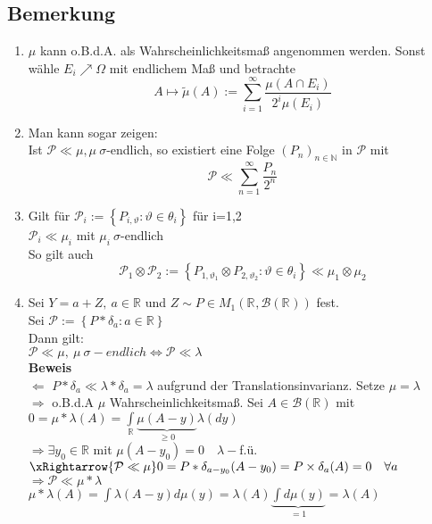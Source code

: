 \documentclass[german,10pt,oneside, fleqn, a4paper]{article}
\newcommand {\R}	{\mathbb{R}}
\newcommand {\N}	{\mathbb{N}}
\newcommand{\Ra}	{\Rightarrow}
\newcommand{\La}	{\Leftarrow}
\newcommand{\LRa}{\Leftrightarrow}
\newcommand{\sm}[2][\infty]{\sum\limits_{#2}^{#1}}
\newcommand{\brc}[1]{\left(#1\right)}
\newcommand{\brac}[1]{\left\lbrace #1\right\rbrace}
\newcommand{\folge}[3][\N]{\left(#2_#3\right)_{#3\in #1}}
\newcommand{\mc}[1]{\mathcal{#1}}
\newcommand{\beweis}{\textbf{Beweis}\\}
\newcommand{\1}[1]{1_{#1}}
\newcommand{\2}[1]{\1{\brac{#1}}}
\newcommand{\rbor}[1][d]{\brc{\R^{#1},\mc{B}\brc{\R^{#1}}}}
\newcommand{\intr}{\int\limits_\R}
\newcommand{\p}{\mc{P}}
\begin{document}
\subsection{Bemerkung}
\label{9.7}
\begin{enumerate}[label=(\roman*)]
\item $\mu$ kann o.B.d.A. als Wahrscheinlichkeitsmaß angenommen werden. Sonst wähle $E_i\nearrow\Omega$ mit endlichem Maß und betrachte\[
A\mapsto\tilde{\mu}(A):=\sm{i=1}\dfrac{\mu(A\cap E_i)}{2^i\mu(E_i)}\]
\item Man kann sogar zeigen: \\
Ist $\p\ll\mu, \mu\ \sigma$-endlich, so existiert eine Folge $\folge{P}{n}$ in $\p$ mit \[
\p\ll\sm{n=1}\dfrac{P_n}{2^n}\]
\item Gilt für $\p_i:=\brac{P_{i,\vartheta}:\vartheta\in\theta_i}$ für i=1,2 \\
$\p_i\ll\mu_i$ mit $\mu_i\ \sigma$-endlich\\
So gilt auch\[
\p_1\otimes\p_2:=\brac{P_{1,\vartheta_1}\otimes P_{2,\vartheta_2}:\vartheta\in\theta_i}\ll\mu_1\otimes\mu_2\]
\item Sei $Y=a+Z,\ a\in\R$ und $Z\sim P\in M_1\rbor[]$ fest.\\
Sei $\p:=\brac{P*\delta_a:a\in\R}$\\
Dann gilt:\\
$\p\ll\mu,\ \mu\ \sigma-endlich\LRa\p\ll\lambda$\\
\beweis
\glqq $\La$ \grqq $P*\delta_a\ll\lambda*\delta_a=\lambda$ aufgrund der Translationsinvarianz. Setze $\mu=\lambda$\\
\glqq $\Ra$ \grqq o.B.d.A $\mu$ Wahrscheinlichkeitsmaß. Sei $A\in\mc{B}(\R)$ mit\\
$0=\mu*\lambda(A)=\intr \underbrace{\mu(A-y)}_{\geq 0}\lambda(dy)$\\
$\Ra \exists y_0\in\R$ mit $\mu(A-y_0)=0\quad \lambda-$f.ü.\\
$\xRightarrow{\p\ll\mu} 0=P*\delta_{a-y_0}(A-y_0)=P\times\delta_a(A)=0\quad \forall a$\\
$\Ra \p\ll\mu*\lambda$\\
$\mu*\lambda(A)=\int \lambda(A-y)d\mu(y)=\lambda(A)\underbrace{\int d\mu(y)}_{=1}=\lambda(A)$
\end{enumerate}

\pagebreak
\end{document}
